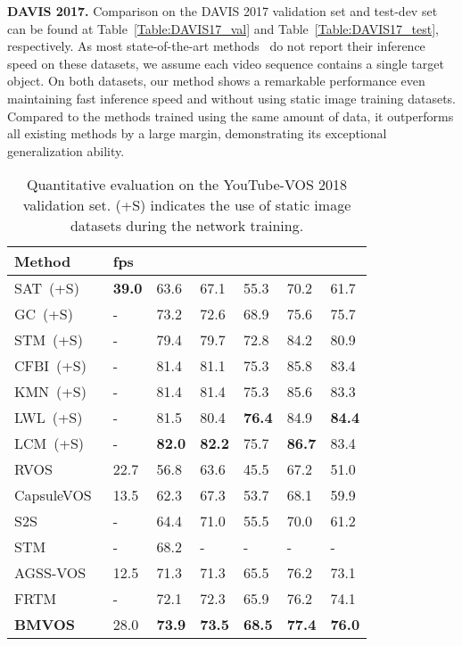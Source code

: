 \documentclass[10pt,twocolumn,letterpaper]{article}
\begin{document}
	
	
	\vspace{1mm} 
	\noindent\textbf{DAVIS 2017.} Comparison on the DAVIS 2017 validation set and test-dev set can be found at Table~\ref{Table:DAVIS17_val} and Table~\ref{Table:DAVIS17_test}, respectively. As most state-of-the-art methods~\cite{STM, GC, KMN, CFBI, RMNet, LCM} do not report their inference speed on these datasets, we assume each video sequence contains a single target object. On both datasets, our method shows a remarkable performance even maintaining fast inference speed and without using static image training datasets. Compared to the methods trained using the same amount of data, it outperforms all existing methods by a large margin, demonstrating its exceptional generalization ability. 

	
	\begin{table}
		\centering 
		\caption{Quantitative evaluation on the YouTube-VOS 2018 validation set. (+S) indicates the use of static image datasets during the network training.}
		\vspace{2mm}
		\small
		\begin{tabular}{p{2.2cm}P{0.52cm}P{0.52cm}P{0.52cm}P{0.52cm}P{0.52cm}P{0.52cm}}
			\toprule
			Method &fps & & & & &\\
			\midrule
			SAT~(+S)~\cite{SAT} &\textbf{39.0} &63.6 &67.1 &55.3 &70.2 &61.7\\
			GC~(+S)~\cite{GC} &- &73.2 &72.6 &68.9 &75.6 &75.7\\
			STM~(+S)~\cite{STM} &- &79.4 &79.7 &72.8 &84.2 &80.9\\
			CFBI~(+S)~\cite{CFBI} &- &81.4 &81.1 &75.3 &85.8 &83.4\\
			KMN~(+S)~\cite{KMN} &- &81.4 &81.4 &75.3 &85.6 &83.3\\
			LWL~(+S)~\cite{LWL} &- &81.5 &80.4 &\textbf{76.4} &84.9 &\textbf{84.4}\\
		    LCM~(+S)~\cite{LCM} &- &\textbf{82.0} &\textbf{82.2} &75.7 &\textbf{86.7}&83.4\\
			\midrule
			RVOS~\cite{RVOS} &22.7 &56.8 &63.6 &45.5 &67.2 &51.0\\
			CapsuleVOS~\cite{CapsuleVOS} &13.5 &62.3 &67.3 &53.7 &68.1 &59.9\\
			S2S~\cite{S2S} &- &64.4 &71.0 &55.5 &70.0 &61.2\\
			STM~\cite{STM} &- &68.2 &- &- &- &-\\
			AGSS-VOS~\cite{AGSS-VOS} &12.5 &71.3 &71.3 &65.5 &76.2 &73.1\\
			FRTM~\cite{FRTM} &- &72.1 &72.3 &65.9 &76.2 &74.1\\
			\midrule
			\textbf{BMVOS} &28.0 &\textbf{73.9} &\textbf{73.5} &\textbf{68.5} &\textbf{77.4} &\textbf{76.0}\\
			\bottomrule
		\end{tabular}
		\label{Table:YTVOS}
	\end{table}
	
\end{document}
